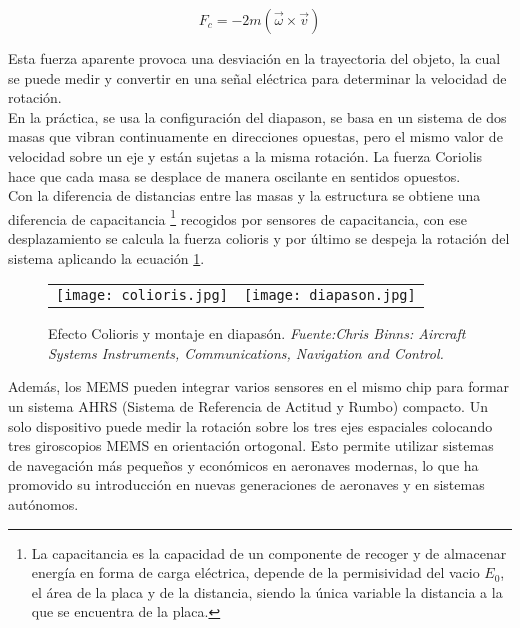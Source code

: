 \begin{equation}
F_c = -2m (\vec{\omega} \times \vec{v})
\label{fig:colioris}
\end{equation}

Esta fuerza aparente provoca una desviación en la trayectoria del objeto, la cual se puede medir y convertir en una señal eléctrica para determinar la velocidad de rotación.\\

En la práctica, se usa la configuración del diapason, se basa en un sistema de dos masas que  vibran continuamente en direcciones opuestas, pero el mismo valor de velocidad sobre un eje y están sujetas a la misma rotación. La fuerza Coriolis hace que cada masa se desplace de manera oscilante en sentidos opuestos.\\

Con la diferencia de distancias entre las masas y la estructura se obtiene una diferencia de capacitancia \footnote{La capacitancia es la capacidad de un componente de recoger y de almacenar energía en forma de carga eléctrica, depende de la permisividad del vacio \(E_0\), el área de la placa y de la distancia, siendo la única variable la distancia a la que se encuentra de la placa.} recogidos por sensores de capacitancia, con ese desplazamiento se calcula la fuerza colioris y por último se despeja la rotación del sistema aplicando la ecuación \ref{fig:colioris}.

\begin{figure}[H]
    \centering    
  \begin{tabular}{c c}  
        \texttt{[image: colioris.jpg]} & 
        \texttt{[image: diapason.jpg]} \\
    \end{tabular}

    \caption{\centering Efecto Colioris y montaje en diapasón.\textit{ Fuente:Chris Binns: Aircraft Systems Instruments, Communications, Navigation and Control.}}
    \label{fig:colioris}
\end{figure}

Además, los MEMS pueden integrar varios sensores en el mismo chip para formar un sistema AHRS (Sistema de Referencia de Actitud y Rumbo) compacto. Un solo dispositivo puede medir la rotación sobre los tres ejes espaciales colocando tres giroscopios MEMS en orientación ortogonal. Esto permite utilizar sistemas de navegación más pequeños y económicos en aeronaves modernas, lo que ha promovido su introducción en nuevas generaciones de aeronaves y en sistemas autónomos.

